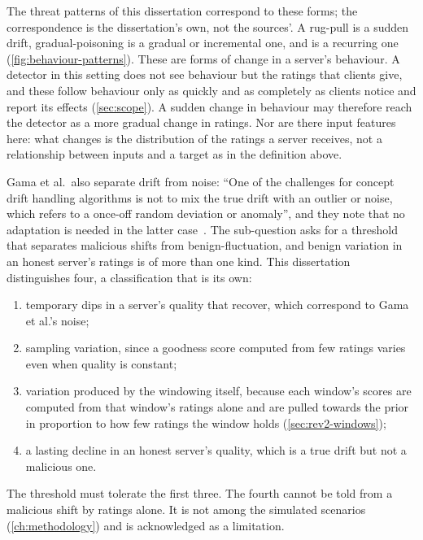 The threat patterns of this dissertation correspond to these forms; the correspondence is the dissertation's own, not the sources'. A \gls{rug-pull} is a sudden drift, \gls{gradual-poisoning} is a gradual or incremental one, and  is a recurring one (\cref{fig:behaviour-patterns}). These are forms of change in a server's behaviour. A detector in this setting does not see behaviour but the ratings that clients give, and these follow behaviour only as quickly and as completely as clients notice and report its effects (\cref{sec:scope}). A sudden change in behaviour may therefore reach the detector as a more gradual change in ratings. Nor are there input features here: what changes is the distribution of the ratings a server receives, not a relationship between inputs and a target as in the definition above.

Gama et al.\ also separate drift from noise: \enquote{One of the challenges for concept drift handling algorithms is not to mix the true drift with an outlier or noise, which refers to a once-off random deviation or anomaly}, and they note that no adaptation is needed in the latter case~\cite[p.~44:6]{Gama2014}. The sub-question asks for a threshold that separates malicious shifts from \gls{benign-fluctuation}, and benign variation in an honest server's ratings is of more than one kind. This dissertation distinguishes four, a classification that is its own:

\begin{enumerate}
    \item temporary dips in a server's quality that recover, which correspond to Gama et al.'s noise;
    \item sampling variation, since a goodness score computed from few ratings varies even when quality is constant;
    \item variation produced by the windowing itself, because each window's scores are computed from that window's ratings alone and are pulled towards the prior in proportion to how few ratings the window holds (\cref{sec:rev2-windows});
    \item a lasting decline in an honest server's quality, which is a true drift but not a malicious one.
\end{enumerate}

The threshold must tolerate the first three. The fourth cannot be told from a malicious shift by ratings alone. It is not among the simulated scenarios (\cref{ch:methodology}) and is acknowledged as a limitation.

